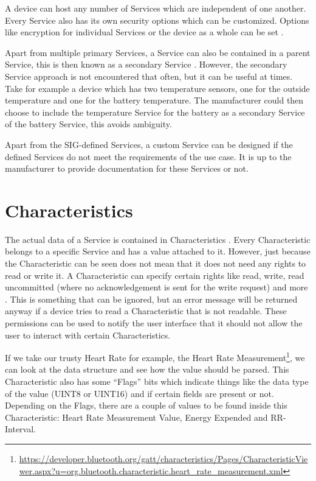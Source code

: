 \documentclass[pdftex,a4paper,12pt,twoside]{report}
\begin{document}
A device can host any number of Services which are independent of one another. Every Service also has its own security options which can be customized. Options like encryption for individual Services or the device as a whole can be set \citep{Townsend2014}.

Apart from multiple primary Services, a Service can also be contained in a parent Service, this is then known as a secondary Service \citep{bluetooth2014bluetooth}. However, the secondary Service approach is not encountered that often, but it can be useful at times. Take for example a device which has two temperature sensors, one for the outside temperature and one for the battery temperature. The manufacturer could then choose to include the temperature Service for the battery as a secondary Service of the battery Service, this avoids ambiguity.

Apart from the SIG-defined Services, a custom Service can be designed if the defined Services do not meet the requirements of the use case. It is up to the manufacturer to provide documentation for these Services or not.

\section{Characteristics}
\label{sec:characteristics}
The actual data of a Service is contained in Characteristics \citep{bluetooth2014bluetooth}. Every Characteristic belongs to a specific Service and has a value attached to it. However, just because the Characteristic can be seen does not mean that it does not need any rights to read or write it. A Characteristic can specify certain rights like read, write, read uncommitted (where no acknowledgement is sent for the write request) and more \citep{heydon2012bluetooth}. This is something that can be ignored, but an error message will be returned anyway if a device tries to read a Characteristic that is not readable. These permissions can be used to notify the user interface that it should not allow the user to interact with certain Characteristics.

If we take our trusty Heart Rate for example, the Heart Rate Measurement\footnote{\url{https://developer.bluetooth.org/gatt/characteristics/Pages/CharacteristicViewer.aspx?u=org.bluetooth.characteristic.heart\_rate\_measurement.xml}}, we can look at the data structure and see how the value should be parsed. This Characteristic also has some ``Flags'' bits which indicate things like the data type of the value (UINT8 or UINT16) and if certain fields are present or not. Depending on the Flags, there are a couple of values to be found inside this Characteristic: Heart Rate Measurement Value, Energy Expended and RR-Interval.
\end{document}
